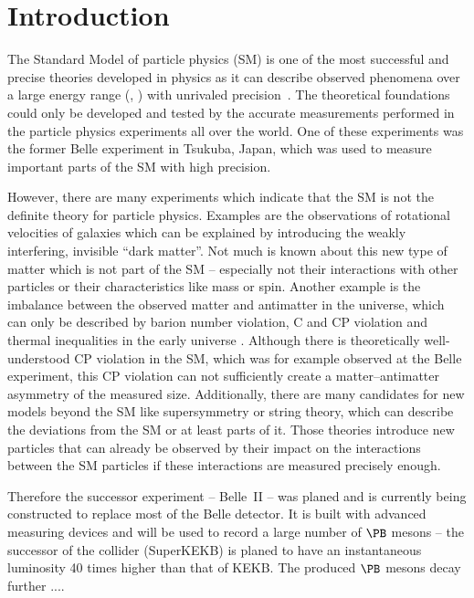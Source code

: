 \chapter{Introduction}

The Standard Model of particle physics (SM) is one of the most successful and precise theories developed in physics as it can describe observed phenomena over a large energy range (\cite{omg}, \cite{hydrogen}) with unrivaled precision~\cite{mu}. The theoretical foundations could only be developed and tested by the accurate measurements performed in the particle physics experiments all over the world. One of these experiments was the former Belle experiment in Tsukuba, Japan, which was used to measure important parts of the SM with high precision. 

However, there are many experiments which indicate that the SM is not the definite theory for particle physics. Examples are the observations of rotational velocities of galaxies \cite{galaxy} which can be explained by introducing the weakly interfering, invisible ``dark matter''. Not much is known about this new type of matter which is not part of the SM -- especially not their interactions with other particles or their characteristics like mass or spin. Another example is the imbalance between the observed matter and antimatter in the universe, which can only be described by barion number violation, C and CP violation and thermal inequalities in the early universe \cite{antimatter}. Although there is theoretically well-understood CP violation in the SM, which was for example observed at the Belle experiment, this CP violation can not sufficiently create a matter--antimatter asymmetry of the measured size. Additionally, there are many candidates for new models beyond the SM like supersymmetry or string theory, which can describe the deviations from the SM or at least parts of it. Those theories introduce new particles that can already be observed by their impact on the interactions between the SM particles if these interactions are measured precisely enough.

Therefore the successor experiment -- Belle~II -- was planed and is currently being constructed to replace most of the Belle detector. It is built with advanced measuring devices and will be used to record a large number of $\PB$ mesons -- the successor of the collider (SuperKEKB) is planed to have an instantaneous luminosity 40 times higher than that of KEKB. The produced $\PB$ mesons decay further ....


